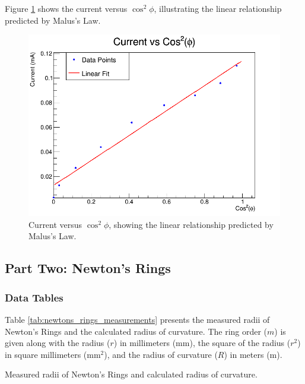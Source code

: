 \documentclass[journal]{IEEEtran}
\begin{document}
Figure \ref{fig:current_vs_cos2} shows the current versus $\cos^2\phi$, illustrating the linear relationship predicted by Malus's Law.

\begin{figure}[H]
    \centering
    \includegraphics[width=\linewidth]{../plots/I_vs_Cos2Phi.png}
    \caption{Current versus $\cos^2\phi$, showing the linear relationship predicted by Malus's Law.}
    \label{fig:current_vs_cos2}
\end{figure}

\subsection{Part Two: Newton's Rings}

\subsubsection{Data Tables}
Table \ref{tab:newtons_rings_measurements} presents the measured radii of Newton's Rings and the calculated radius of curvature. The ring order ($m$) is given along with the radius ($r$) in millimeters (mm), the square of the radius ($r^2$) in square millimeters (mm$^2$), and the radius of curvature ($R$) in meters (m).

\begin{table}[H]
    \centering
    \caption{Measured radii of Newton's Rings and calculated radius of curvature.}
    \label{tab:newtons_rings_measurements}
\end{table}
\end{document}
